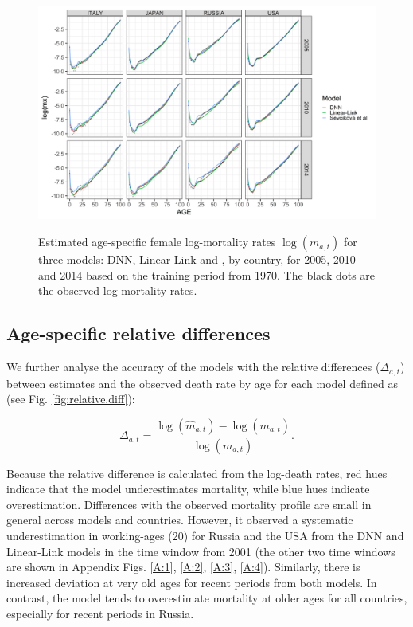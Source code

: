 \documentclass[a4,11pt]{article}
\begin{document}
\begin{figure}[H]
	\centering
	\includegraphics[width=1\linewidth]{age_pattern_F_1970}\\
	 \caption{Estimated age-specific female log-mortality rates $\log(m_{a,t})$ for three models: DNN, Linear-Link and \citet{Sevcikova}, by country, for 2005, 2010 and 2014 based on the training period from 1970. The black dots are the observed log-mortality rates.} 
	 \label{fig:estimate.age.mx}
\end{figure}



\subsection*{Age-specific relative differences} 


We further analyse the accuracy of the models with the relative differences ($\Delta_{a,t}$) between estimates and the observed death rate by age for each model defined as (see Fig. \ref{fig:relative.diff}):

$$\Delta_{a,t}=\frac{\log(\hat{m}_{a,t})-\log(m_{a,t})}{\log(m_{a,t})}.$$

Because the relative difference is calculated from the log-death rates, red hues indicate that the model underestimates mortality, while blue hues indicate overestimation. Differences with the observed mortality profile are small in general across models and countries. However, it observed a systematic underestimation in working-ages (20) for Russia and the USA from the DNN and Linear-Link models in the time window from 2001 (the other two time windows are shown in Appendix Figs. \ref{A:1}, \ref{A:2}, \ref{A:3}, \ref{A:4}). Similarly, there is increased deviation at very old ages for recent periods from both models. In contrast, the \citet{Sevcikova} model tends to overestimate mortality at older ages for all countries, especially for recent periods in Russia. 
\end{document}
